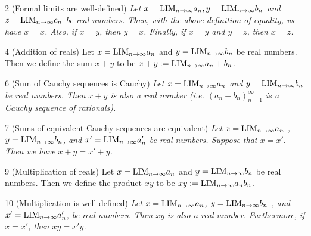 \begin{proposition}{2}
    \label{formal-limit-equality}
    (Formal limits are well-defined) \emph{Let $x = \text{LIM}_{n \rightarrow \infty}{a_n}, y = \text{LIM}_{n \rightarrow \infty}{b_n}$
    and $z = \text{LIM}_{n \rightarrow \infty}{c_n}$ be real numbers. Then, with the above definition
    of equality, we have $x = x$. Also, if $x = y$, then $y = x$. Finally, if
    $x = y$ and $y = z$, then $x = z$.}
\end{proposition}

\begin{definition}{4}
    \label{real-addition}
    (Addition of reals) Let $x = \text{LIM}_{n \rightarrow \infty}{a_n}$ and $y = \text{LIM}_{n \rightarrow \infty}{b_n}$
    be real numbers. Then we define the sum $x + y$ to be $x + y := \text{LIM}_{n \rightarrow \infty}{a_n + b_n}$.
\end{definition}

\begin{lemma}{6}
    \label{cauchy-sum}
    (Sum of Cauchy sequences is Cauchy) \emph{Let $x = \text{LIM}_{n \rightarrow \infty}{a_n}$ and $y = \text{LIM}_{n \rightarrow \infty}{b_n}$
    be real numbers. Then $x + y$ is also a real number (i.e. $(a_n + b_n)_{n = 1}^{\infty}$
    is a Cauchy sequence of rationals).}
\end{lemma}

\begin{lemma}{7}
    \label{cauchy-sum-equivalent}
    (Sums of equivalent Cauchy sequences are equivalent) \emph{Let $x = \text{LIM}_{n \rightarrow \infty}{a_n}$
    , $y = \text{LIM}_{n \rightarrow \infty}{b_n}$, and $x' = \text{LIM}_{n \rightarrow \infty}{a_n'}$ be real numbers.
    Suppose that $x = x'$. Then we have $x + y = x' + y$.}
\end{lemma}

\begin{definition}{9}
    \label{real-multiplication}
    (Multiplication of reals) Let $x = \text{LIM}_{n \rightarrow \infty}{a_n}$ and $y = \text{LIM}_{n \rightarrow \infty}{b_n}$
    be real numbers. Then we define the product $xy$ to be $xy := \text{LIM}_{n \rightarrow \infty}{a_n b_n}$.
\end{definition}

\begin{proposition}{10}
    \label{real-multiplication-well-defined}
    (Multiplication is well defined) \emph{Let $x = \text{LIM}_{n \rightarrow \infty}{a_n}$, $y = \text{LIM}_{n \rightarrow \infty}{b_n}$
    , and $x' = \text{LIM}_{n \rightarrow \infty}{a_n'}$, be real numbers.
    Then $xy$ is also a real number. Furthermore, if $x = x'$, then $xy = x'y$.}
\end{proposition}

